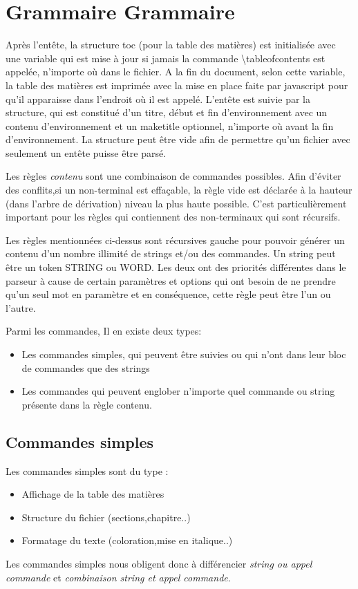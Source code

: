 \documentclass{report}
\begin{document}
\section{Grammaire Grammaire}{
Après l'entête, la structure toc (pour la table des matières) est initialisée avec une variable qui est mise à jour si jamais la commande \textbackslash tableofcontents est appelée, n'importe où dans le fichier. A la fin du document, selon cette variable, la table des matières est imprimée avec la mise en place faite par javascript pour qu'il apparaisse dans l'endroit où il est appelé. L'entête est suivie par la structure, qui est constitué d'un titre, début et fin d'environnement avec un contenu d'environnement et un maketitle optionnel, n'importe où avant la fin d'environnement. La structure peut être vide afin de permettre  qu'un fichier avec seulement un entête puisse être parsé. 

Les règles \textit{contenu} sont une combinaison de commandes possibles. Afin d'éviter des conflits,si un non-terminal est effaçable, la règle vide est déclarée à la hauteur (dans l'arbre de dérivation) niveau la plus haute possible. C'est particulièrement important pour les règles qui contiennent des non-terminaux qui sont récursifs.

 Les règles mentionnées ci-dessus sont récursives gauche pour pouvoir générer un contenu d'un nombre illimité de strings et/ou des commandes. Un string peut être un token STRING ou WORD. Les deux ont des priorités différentes dans le parseur à cause de certain paramètres et options qui ont besoin de ne prendre qu'un seul mot en paramètre et en conséquence, cette règle peut être l'un ou l'autre.

Parmi les commandes, Il en existe deux types: 
\begin{itemize}
\item Les commandes simples, qui peuvent être suivies ou qui n'ont dans leur bloc de commandes que des strings 
\item Les commandes qui peuvent englober n'importe quel commande ou string présente dans la règle contenu.
\end{itemize}
\subsection{Commandes simples}{
Les commandes simples sont du type :
 \begin{itemize}
 \item Affichage de la table des matières
 \item Structure du fichier (sections,chapitre..)
 \item Formatage du texte (coloration,mise en italique..)
\end{itemize} 
Les commandes simples nous obligent donc à différencier
 \textit{string ou appel commande} et 
 \textit{combinaison string et appel commande}.
}}
\end{document}
